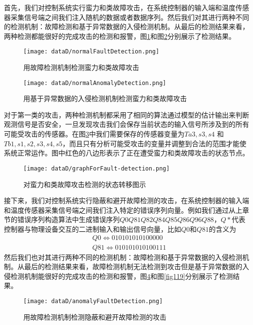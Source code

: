 首先，我们对控制系统实行蛮力和类故障攻击，在系统控制器的输入端和温度传感器采集信号端之间我们注入随机的数据或者数据序列。然后我们对其进行两种不同的检测机制：故障检测和基于异常数据的入侵检测机制。从最后的检测结果来看，两种检测都能很好的完成攻击的检测和报警，图\ref{fig115}和图\ref{fig116}分别展示了检测结果。
	
	\begin{figure}[!htbp]
		\centering
		\texttt{[image: dataD/normalFaultDetection.png]}
		\caption{用故障检测机制检测蛮力和类故障攻击}
		\label{fig115}
	\end{figure}
	
	\begin{figure}[!htbp]
		\centering
		\texttt{[image: dataD/normalAnomalyDetection.png]}
		\caption{用基于异常数据的入侵检测机制检测蛮力和类故障攻击}
		\label{fig116}
	\end{figure}
	
	
	对于第一类的攻击，两种检测机制都采用了相同的算法通过模型的估计输出来判断观测信号是否安全，一旦发现攻击我们会保存当前状态的输入信号所涉及到的所有可能受攻击的传感器。在图\ref{fig117}中我们需要保存的传感器变量为$Ta3,s3,s4$ 和 $Tb1,s1,s2,s3,s4,s5$，而且只有分析可能受攻击的变量并调整到合法的范围才能使系统正常运作。图中红色的八边形表示了正在遭受蛮力和类故障攻击的状态节点。
	\begin{figure}[!htb]
		\centering
		\texttt{[image: dataD/graphForFault-detection.png]}
		\caption{对蛮力和类故障攻击检测的状态转移图示}
		\label{fig117}
	\end{figure}
	

	接下来，我们对控制系统实行隐蔽和避开故障检测的攻击，在系统控制器的输入端和温度传感器采集信号端之间我们注入特定的错误序列向量。例如我们通过从上章节的错误序列构造算法中生成错误序列$Q0Q81Q82Q84Q85Q86Q96Q88$，$Q*$代表控制器与物理设备交互的二进制输入和输出信号向量，比如$Q0$和$Q81$的含义为\[\begin{split}
	&Q0\Leftrightarrow 010101010100000\\
	&Q81\Leftrightarrow 010101010100111
	\end{split}
	\] 然后我们也对其进行两种不同的检测机制：故障检测和基于异常数据的入侵检测机制。从最后的检测结果来看，故障检测机制无法检测到攻击但是基于异常数据的入侵检测机制能很好的完成攻击的检测和报警，图\ref{fig118}和图\ref{fig119}分别展示了检测结果。
	
		\begin{figure}[!htb]
			\centering
			\texttt{[image: dataD/anomalyFaultDetection.png]}
			\caption{用故障检测机制检测隐蔽和避开故障检测的攻击}
			\label{fig118}
		\end{figure}
		
